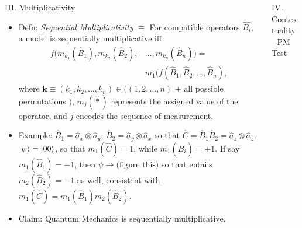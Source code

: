 \documentclass[final,hyperref={pdfpagelabels=false}]{beamer}
\begin{document}
\begin{frame}[t]
\begin{columns}[c]
\begin{column}{.69\textwidth}
\begin{columns}[c]
\begin{column}{.48\textwidth}
\begin{block}{III. Multiplicativity}
\begin{itemize}
            \item Defn: \emph{Sequential Multiplicativity} $\equiv$ For compatible operators $\hat{B_i}$, a model is sequentially multiplicative iff 
              \begin{align} f(m_{k_1}(\hat{B}_1),m_{k_2}(\hat{B}_2),&\dots,m_{k_n}(\hat{B}_n)) = \\
                                                                    &m_1(f(\hat{B}_1,\hat{B}_2,\dots,\hat{B}_n),
              \end{align}
              where $\mathbf k \equiv (k_1,k_2,\dots,k_n) \in ((1,2,\dots,n)$ + all possible permutations $)$, $m_j(\hat *)$ represents the assigned value of the operator, and $j$ encodes the sequence of measurement.

            \item Example: $\hat B_1 = \hat {\sigma} _x \otimes \hat {\sigma}_y$, $\hat B_2 = \hat {\sigma} _y \otimes \hat {\sigma}_x$ so that $\hat C = \hat B_1 \hat B_2 = \hat \sigma _z \otimes \hat \sigma _z$. $\ket {\psi}=\ket{00}$, so that $m_1(\hat C)=1$, while $m_1(\hat B_i)=\pm 1$. If say $m_1(\hat B_1)=-1$, then ${\psi} \to \text{(figure this)}$ so that entails $m_2(\hat B_2)=-1$ as well, consistent with $m_1(\hat C)=m_1(\hat B_1)m_2(\hat B_2)$.

            \item Claim: Quantum Mechanics is sequentially multiplicative.

            \end{itemize}

          \end{block}

        \end{column}

        \begin{column}{.46\textwidth}

          \begin{block}{IV. Contextuality - PM Test}



\end{block}
\end{column}
\end{columns}
\end{column}
\end{columns}
\end{frame}
\end{document}
